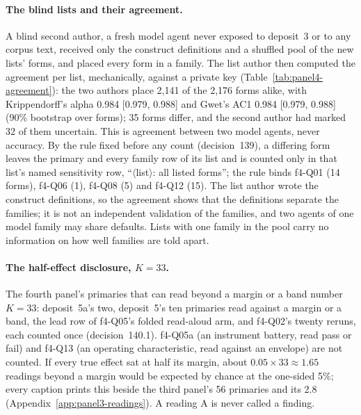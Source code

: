 \paragraph{The blind lists and their agreement.} A blind second author, a fresh model agent never exposed to deposit~3
or to any corpus text, received only the construct definitions and a shuffled pool of the new lists' forms, and placed
every form in a family. The list author then computed the agreement per list, mechanically, against a private key
(Table~\ref{tab:panel4-agreement}): the two authors place 2,141 of the 2,176 forms alike, with Krippendorff's alpha 0.984
[0.979, 0.988] and Gwet's AC1 0.984 [0.979, 0.988] (90\% bootstrap over forms); 35 forms differ, and the second author
had marked 32 of them uncertain. This is agreement between two model agents, never accuracy. By the rule fixed before any
count (decision~139), a differing form leaves the primary and every family row of its list and is counted only in that
list's named sensitivity row, ``$\langle$list$\rangle$: all listed forms''; the rule binds f4-Q01 (14 forms), f4-Q06 (1),
f4-Q08 (5) and f4-Q12 (15). The list author wrote the construct definitions, so the agreement shows that the definitions
separate the families; it is not an independent validation of the families, and two agents of one model family may share
defaults. Lists with one family in the pool carry no information on how well families are told apart.

\paragraph{The half-effect disclosure, $K = 33$.} The fourth panel's primaries that can read beyond a margin or a band
number $K = 33$: deposit~5a's two, deposit~5's ten primaries read against a margin or a band, the lead row of f4-Q05's
folded read-aloud arm, and f4-Q02's twenty reruns, each counted once (decision~140.1). f4-Q05a (an instrument battery,
read pass or fail) and f4-Q13 (an operating characteristic, read against an envelope) are not counted. If every true
effect sat at half its margin, about $0.05 \times 33 \approx 1.65$ readings beyond a margin would be expected by chance at
the one-sided 5\%; every caption prints this beside the third panel's 56 primaries and its 2.8
(Appendix~\ref{app:panel3-readings}). A reading A is never called a finding.

